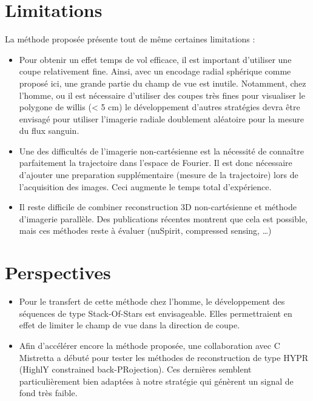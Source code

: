 \section{Limitations}

La méthode proposée présente tout de même certaines limitations :
\begin{itemize}
\item Pour obtenir un effet temps de vol efficace, il est important d’utiliser une coupe relativement fine. Ainsi, avec un encodage radial sphérique comme proposé ici, une grande partie du champ de vue est inutile. Notamment, chez l’homme, ou il est nécessaire d’utiliser des coupes très fines pour visualiser le polygone de willis (< 5 cm) le développement d’autres stratégies devra être envisagé pour utiliser l’imagerie radiale doublement aléatoire pour la mesure du flux sanguin. 
\item Une des difficultés de l’imagerie non-cartésienne est la nécessité de connaître parfaitement la trajectoire dans l’espace de Fourier. Il est donc nécessaire d’ajouter une preparation supplémentaire (mesure de la trajectoire) lors de l’acquisition des images. Ceci augmente le temps total d'expérience.
\item Il reste difficile de combiner reconstruction 3D non-cartésienne et méthode d’imagerie parallèle. Des publications récentes montrent que cela est possible, mais ces méthodes reste à évaluer (nuSpirit, compressed sensing, …)
\end{itemize}

\section{Perspectives}
\begin{itemize}
\item Pour le transfert de cette méthode chez l’homme, le développement des séquences de type Stack-Of-Stars est envisageable. Elles permettraient en effet de limiter le champ de vue dans la direction de coupe.

\item Afin d’accélérer encore la méthode proposée, une collaboration avec C Mistretta a débuté pour tester les méthodes de reconstruction de type HYPR (HighlY constrained back-PRojection). Ces dernières semblent particulièrement bien adaptées à notre stratégie qui génèrent un signal de fond très faible.
\end{itemize}

\cleardoublepage
